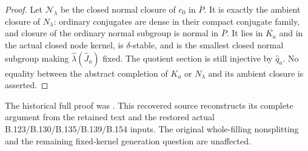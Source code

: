 \begin{proof}
Let $\mathcal N_\lambda$ be the closed normal closure of $c_0$
in $\overline P$. It is exactly the ambient closure of $N_\lambda$:
ordinary conjugates are dense in their compact conjugate family,
and closure of the ordinary normal subgroup is normal in
$\overline P$. It lies in $\overline{K_a}$ and in the actual closed
node kernel, is $\delta$-stable, and is the smallest closed normal
subgroup making $\widehat\lambda(\widehat J_a)$ fixed.
The quotient section is still injective by $\widehat q_a$.
No equality between the abstract completion of $K_a$ or
$N_\lambda$ and its ambient closure is asserted.
\end{proof}
The historical full proof was
.
This recovered source reconstructs its complete argument from the
retained text and the restored actual B.123/B.130/B.135/B.139/B.154
inputs. The original whole-filling nonsplitting and the remaining
fixed-kernel generation question are unaffected.
